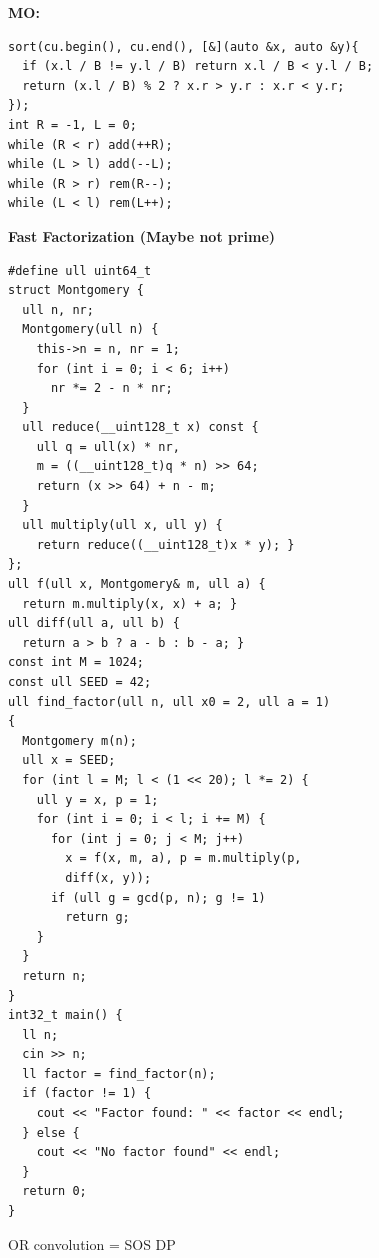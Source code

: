 \textbf{MO:}
\begin{lstlisting}
sort(cu.begin(), cu.end(), [&](auto &x, auto &y){
  if (x.l / B != y.l / B) return x.l / B < y.l / B;
  return (x.l / B) % 2 ? x.r > y.r : x.r < y.r;
});
int R = -1, L = 0;
while (R < r) add(++R);
while (L > l) add(--L);
while (R > r) rem(R--);
while (L < l) rem(L++);
\end{lstlisting}

\textbf{Fast Factorization (Maybe not prime)}
\begin{lstlisting}
#define ull uint64_t
struct Montgomery {
  ull n, nr;
  Montgomery(ull n) {
    this->n = n, nr = 1;
    for (int i = 0; i < 6; i++)
      nr *= 2 - n * nr;
  }
  ull reduce(__uint128_t x) const {
    ull q = ull(x) * nr,
    m = ((__uint128_t)q * n) >> 64;
    return (x >> 64) + n - m;
  }
  ull multiply(ull x, ull y) {
    return reduce((__uint128_t)x * y); }
};
ull f(ull x, Montgomery& m, ull a) {
  return m.multiply(x, x) + a; }
ull diff(ull a, ull b) {
  return a > b ? a - b : b - a; }
const int M = 1024;
const ull SEED = 42;
ull find_factor(ull n, ull x0 = 2, ull a = 1)
{
  Montgomery m(n);
  ull x = SEED;
  for (int l = M; l < (1 << 20); l *= 2) {
    ull y = x, p = 1;
    for (int i = 0; i < l; i += M) {
      for (int j = 0; j < M; j++)
        x = f(x, m, a), p = m.multiply(p,
        diff(x, y));
      if (ull g = gcd(p, n); g != 1)
        return g;
    }
  }
  return n;
}
int32_t main() {
  ll n;
  cin >> n;
  ll factor = find_factor(n);
  if (factor != 1) {
    cout << "Factor found: " << factor << endl;
  } else {
    cout << "No factor found" << endl;
  }
  return 0;
}
\end{lstlisting}

OR convolution = SOS DP
